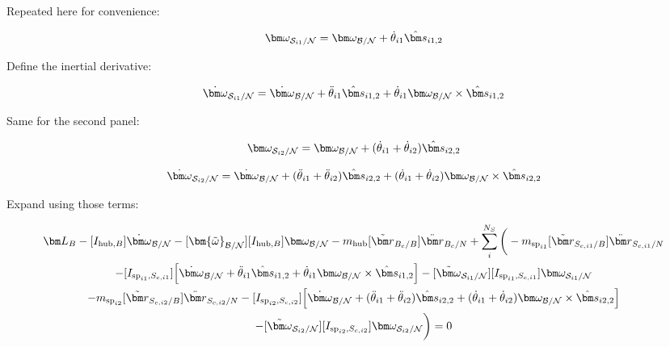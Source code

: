 Repeated here for convenience:

\begin{equation}
	\bm \omega_{\mathcal{S}_{i1}/\mathcal{N}} = \bm \omega_{\cal{B/N}} + \dot{\theta}_{i1} \hat{\bm s}_{i1,2}
\end{equation}

Define the inertial derivative:

\begin{equation}
	\dot{\bm \omega}_{\mathcal{S}_{i1}/\mathcal{N}} = \dot{\bm \omega}_{\cal{B/N}} + \ddot{\theta}_{i1} \hat{\bm s}_{i1,2} + \dot{\theta}_{i1} \bm \omega_{\cal{B/N}} \times \hat{\bm s}_{i1,2}
\end{equation}

Same for the second panel:

\begin{equation}
	\bm \omega_{\mathcal{S}_{i2}/\mathcal{N}} = \bm \omega_{\cal{B/N}} + (\dot{\theta}_{i1}  + \dot{\theta}_{i2})\hat{\bm s}_{i2,2}
\end{equation}

\begin{equation}
	\dot{\bm \omega}_{\mathcal{S}_{i2}/\mathcal{N}} = \dot{\bm \omega}_{\cal{B/N}} + (\ddot{\theta}_{i1}  + \ddot{\theta}_{i2})\hat{\bm s}_{i2,2} + (\dot{\theta}_{i1}  + \dot{\theta}_{i2}) \bm \omega_{\cal{B/N}} \times \hat{\bm s}_{i2,2}
\end{equation}

Expand using those terms:

\begin{multline}
	\bm L_B -[I_{\text{hub},B}] \dot{\bm\omega}_{\cal B/N}  -[\bm{\tilde{\omega}}_{\cal B/N}] [I_{\text{hub},B}] \bm\omega_{\cal B/N} - m_{\text{hub}} [\tilde{{\bm r}}_{B_c/B}] \ddot{\bm r}_{B_c/N}
	+ \sum\limits_{i}^{N_S}\bigg(- m_{\text{sp}_{i1}} [\tilde{{\bm r}}_{S_{c,i1}/B}] \ddot{\bm r}_{S_{c,i1}/N} \\
	-[I_{\text{sp}_{i1},S_{c,i1}}] \Big[\dot{\bm \omega}_{\cal{B/N}} + \ddot{\theta}_{i1} \hat{\bm s}_{i1,2} + \dot{\theta}_{i1} \bm \omega_{\cal{B/N}} \times \hat{\bm s}_{i1,2}\Big]  -[\tilde{\bm \omega}_{\mathcal{S}_{i1}/\mathcal{N}}] [I_{\text{sp}_{i1},S_{c,i1}}] \bm \omega_{\mathcal{S}_{i1}/\mathcal{N}}\\
	- m_{\text{sp}_{i2}} [\tilde{{\bm r}}_{S_{c,i2}/B}] \ddot{\bm r}_{S_{c,i2}/N} -[I_{\text{sp}_{i2},S_{c,i2}}] \Big[\dot{\bm \omega}_{\cal{B/N}} + (\ddot{\theta}_{i1}  + \ddot{\theta}_{i2})\hat{\bm s}_{i2,2} + (\dot{\theta}_{i1}  + \dot{\theta}_{i2}) \bm \omega_{\cal{B/N}} \times \hat{\bm s}_{i2,2}\Big]  \\
	-[\tilde{\bm \omega}_{\mathcal{S}_{i2}/\mathcal{N}}] [I_{\text{sp}_{i2},S_{c,i2}}] \bm \omega_{\mathcal{S}_{i2}/\mathcal{N}}\bigg) = 0
\end{multline}

